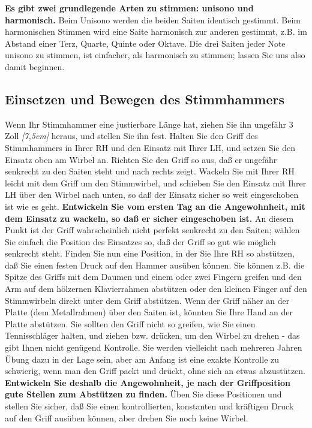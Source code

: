 \textbf{Es gibt zwei grundlegende Arten zu stimmen: unisono und harmonisch.}
 Beim Unisono werden die beiden Saiten identisch gestimmt.
 Beim harmonischen Stimmen wird eine Saite harmonisch zur anderen gestimmt, z.B. im Abstand einer Terz, Quarte, Quinte oder Oktave.
 Die drei Saiten jeder Note unisono zu stimmen, ist einfacher, als harmonisch zu stimmen; lassen Sie uns also damit beginnen.
 \hypertarget{c2_5b}{}\hypertarget{c2_5_hamm}{}

\subsection{Einsetzen und Bewegen des Stimmhammers}

Wenn Ihr Stimmhammer eine justierbare Länge hat, ziehen Sie ihn ungefähr 3 Zoll \textit{[7,5cm]} heraus, und stellen Sie ihn fest.
 Halten Sie den Griff des Stimmhammers in Ihrer RH und den Einsatz mit Ihrer LH, und setzen Sie den Einsatz oben am Wirbel an.
 Richten Sie den Griff so aus, daß er ungefähr senkrecht zu den Saiten steht und nach rechts zeigt.
 Wackeln Sie mit Ihrer RH leicht mit dem Griff um den Stimmwirbel, und schieben Sie den Einsatz mit Ihrer LH über den Wirbel nach unten, so daß der Einsatz sicher so weit eingeschoben ist wie es geht.
 \textbf{Entwickeln Sie vom ersten Tag an die Angewohnheit, mit dem Einsatz zu wackeln, so daß er sicher eingeschoben ist.}
 An diesem Punkt ist der Griff wahrscheinlich nicht perfekt senkrecht zu den Saiten; wählen Sie einfach die Position des Einsatzes so, daß der Griff so gut wie möglich senkrecht steht.
 Finden Sie nun eine Position, in der Sie Ihre RH so abstützen, daß Sie einen festen Druck auf den Hammer ausüben können.
 Sie können z.B. die Spitze des Griffs mit dem Daumen und einem oder zwei Fingern greifen und den Arm auf dem hölzernen Klavierrahmen abstützen oder den kleinen Finger auf den Stimmwirbeln direkt unter dem Griff abstützen.
 Wenn der Griff näher an der Platte (dem Metallrahmen) über den Saiten ist, könnten Sie Ihre Hand an der Platte abstützen.
 Sie sollten den Griff nicht so greifen, wie Sie einen Tennisschläger halten, und ziehen bzw. drücken, um den Wirbel zu drehen - das gibt Ihnen nicht genügend Kontrolle.
 Sie werden vielleicht nach mehreren Jahren Übung dazu in der Lage sein, aber am Anfang ist eine exakte Kontrolle zu schwierig, wenn man den Griff packt und drückt, ohne sich an etwas abzustützen.
 \textbf{Entwickeln Sie deshalb die Angewohnheit, je nach der Griffposition gute Stellen zum Abstützen zu finden.}
 Üben Sie diese Positionen und stellen Sie sicher, daß Sie einen kontrollierten, konstanten und kräftigen Druck auf den Griff ausüben können, aber drehen Sie noch keine Wirbel.
 

